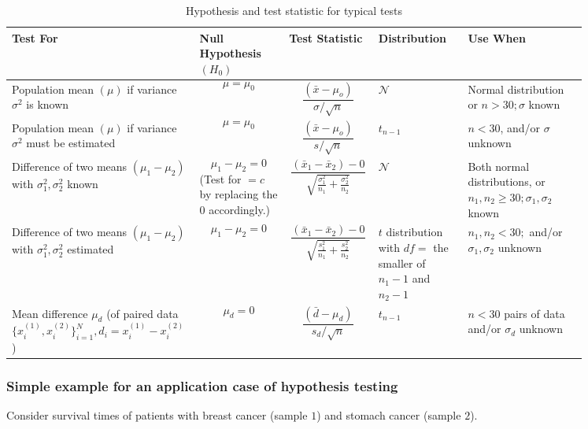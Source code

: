 \begin{table}
    \centering
    \begin{tabular}{|p{0.2\linewidth}|p{0.15\linewidth}|p{0.15\linewidth}|p{0.15\linewidth}|p{0.2\linewidth}|}
        \hline 
        Test For & Null Hypothesis $(H_0)$ & Test Statistic & Distribution & Use When \\
        \hline 
        Population mean $(\mu)$ if variance $\sigma^2$ is known & $$\mu=\mu_0$$ & $$\frac{\left(\bar{x}-\mu_o\right)}{\sigma / \sqrt{n}}$$ & $\mathcal{N}$ & Normal distribution or $n>30 ; \sigma$ known \\
        \hline 
        Population mean $(\mu)$ if variance $\sigma^2$ must be estimated & $$\mu=\mu_0$$ & $$\frac{\left(\bar{x}-\mu_o\right)}{s / \sqrt{n}}$$ & $t_{n-1}$ & $n<30$, and/or $\sigma$ unknown \\
        \hline
        Difference of two means $(\mu_1-\mu_2)$ with $\sigma_1^2,\sigma_2^2$ known & $$\mu_1-\mu_2=0$$ (Test for $=c$ by replacing the $0$ accordingly.) & $$\frac{\left(\bar{x}_1-\bar{x}_2\right)-0}{\sqrt{\frac{\sigma_1^2}{n_1}+\frac{\sigma_2^2}{n_2}}}$$ & $\mathcal{N}$ & Both normal distributions, or $n_1, n_2 \geq 30 ; \sigma_1, \sigma_2$ known \\
        \hline 
        Difference of two means $(\mu_1-\mu_2)$ with $\sigma_1^2,\sigma_2^2$ estimated& $$\mu_1-\mu_2=0$$ & $$\frac{\left(\bar{x}_1-\bar{x}_2\right)-0}{\sqrt{\frac{s_1^2}{n_1}+\frac{s_2^2}{n_2}}}$$ & $t$ distribution with $df=$ the smaller of $n_1-1$ and $n_2-1$ & $n_1, n_2<30 ;$ and/or $\sigma_1, \sigma_2$ unknown \\
        \hline 
        Mean difference $\mu_d$ (of paired data $\{x^{(1)}_i,x^{(2)}_i\}_{i=1}^N, d_i=x^{(1)}_i-x^{(2)}_i$) & $$\mu_d=0$$ & $$\frac{\left(\bar{d}-\mu_d\right)}{s_d / \sqrt{n}}$$ & $t_{n-1}$ & $n<30$ pairs of data and/or $\sigma_d$ unknown \\
        \hline
    \end{tabular}
    \caption{Hypothesis and test statistic for typical tests}
    \label{tab:typical_tests}
\end{table}

\subsubsection{Simple example for an application case of hypothesis testing}

Consider survival times of patients with breast cancer (sample $1$) and stomach cancer (sample $2$).

